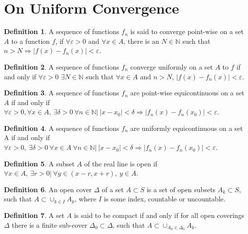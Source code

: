 \documentclass[oneside]{book}
\theoremstyle{definition}
\newtheorem{definition}{Definition}[section]
\begin{document}
\section{On Uniform Convergence}

\begin{definition}
A sequence of functions $f_n$ is said to converge point-wise on a set $A$ to a function $f$, if $\forall\varepsilon>0$ and $\forall x\in A$, there is an $N\in\mathbb{N}$ such that $n>N \Rightarrow |f(x)-f_n(x)|<\varepsilon$.
\end{definition}

\begin{definition}
A sequence of functions $f_n$ converge uniformly on a set $A$ to $f$ if and only if $\forall \varepsilon>0$ $\exists N\in\mathbb{N}$ such that $\forall x \in A$ and $n>N$, $|f(x) -f_n(x)|<\varepsilon$.
\end{definition}

\begin{definition}
A sequence of functions $f_n$ are point-wise equicontinuous on a set $A$ if and only if $\forall \varepsilon>0, \forall x \in A,\ \exists \delta>0\ \forall n\in\mathbb{N}|\ |x-x_0|<\delta \Rightarrow |f_n(x) - f_n(x_0)|<\varepsilon$.
\end{definition}

\begin{definition} A sequence of functions $f_n$ are uniformly equicontinuous on a set A if and only if $\forall\varepsilon>0,\ \exists \delta>0\ \forall x\in A\ \forall n\in\mathbb{N}|\ |x-x_0|<\delta \Rightarrow |f_n(x) - f_n(x_0)|<\varepsilon$.
\end{definition}

\begin{definition} A subset $A$ of the real line is open if $\forall x\in A,\ \exists r>0|\ \forall y \in (x-r,x+r),\ y\in A$.
\end{definition}

\begin{definition}
An open cover $\Delta$ of a set $A\subset S$ is a set of open subsets $A_k\subset S$, such that $A \subset \cup_{k\in I} A_k$, where $I$ is some index, countable or uncountable.
\end{definition}

\begin{definition}
A set $A$ is said to be compact if and only if for all open coverings $\Delta$ there is a finite sub-cover $\Delta_0\subset \Delta$, such that $A\subset \cup_{A_k \in \Delta_0} A_k$.
\end{definition}
\end{document}
